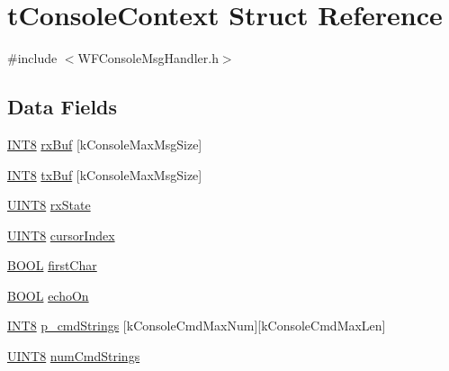 \hypertarget{structt_console_context}{}\section{t\+Console\+Context Struct Reference}
\label{structt_console_context}


{\ttfamily \#include $<$W\+F\+Console\+Msg\+Handler.\+h$>$}

\subsection*{Data Fields}
\begin{DoxyCompactItemize}
\item 
\hyperlink{_generic_type_defs_8h_a7ebe70ceca856797319175e30bcf003d}{I\+N\+T8} \hyperlink{structt_console_context_af9b91afb7d6d9d14fd957c1fbcc904aa}{rx\+Buf} \mbox{[}k\+Console\+Max\+Msg\+Size\mbox{]}
\item 
\hyperlink{_generic_type_defs_8h_a7ebe70ceca856797319175e30bcf003d}{I\+N\+T8} \hyperlink{structt_console_context_a18b2174d74840a7023610daeea28f4db}{tx\+Buf} \mbox{[}k\+Console\+Max\+Msg\+Size\mbox{]}
\item 
\hyperlink{_generic_type_defs_8h_ab27e9918b538ce9d8ca692479b375b6a}{U\+I\+N\+T8} \hyperlink{structt_console_context_a48cf2a4fe3b62ee7f4f54dab3847d191}{rx\+State}
\item 
\hyperlink{_generic_type_defs_8h_ab27e9918b538ce9d8ca692479b375b6a}{U\+I\+N\+T8} \hyperlink{structt_console_context_ac9409ead0276c1cba1595911a6ee7e0d}{cursor\+Index}
\item 
\hyperlink{_generic_type_defs_8h_a54d65c7fa62e62c9754371e42f5111b9}{B\+O\+O\+L} \hyperlink{structt_console_context_aad87158f58fbda38fd65d0a7c9e2e06e}{first\+Char}
\item 
\hyperlink{_generic_type_defs_8h_a54d65c7fa62e62c9754371e42f5111b9}{B\+O\+O\+L} \hyperlink{structt_console_context_ae8e6ee696faa9b95d5cefbad3a2511d3}{echo\+On}
\item 
\hyperlink{_generic_type_defs_8h_a7ebe70ceca856797319175e30bcf003d}{I\+N\+T8} \hyperlink{structt_console_context_a2f68fab83114dfa5468078ffdb5e603b}{p\+\_\+cmd\+Strings} \mbox{[}k\+Console\+Cmd\+Max\+Num\mbox{]}\mbox{[}k\+Console\+Cmd\+Max\+Len\mbox{]}
\item 
\hyperlink{_generic_type_defs_8h_ab27e9918b538ce9d8ca692479b375b6a}{U\+I\+N\+T8} \hyperlink{structt_console_context_a89876e6f19e4204a6b2a2416d6b9bdcd}{num\+Cmd\+Strings}
\item 

\end{DoxyCompactItemize}
